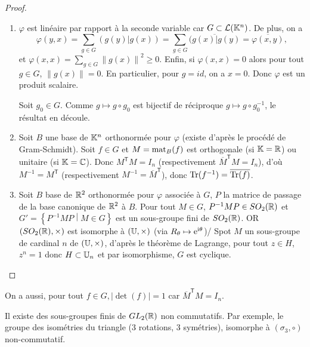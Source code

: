 \documentclass[12pt]{article}
\begin{document}
\begin{proof}
	\phantom{}
	\begin{enumerate}
		\item $\varphi$ est linéaire par rapport à la seconde variable car $G\subset\mathcal{L}(\mathbb{K}^{n})$. De plus, on a 
		\begin{equation}
			\varphi(y,x)=\sum_{g\in G}(g(y)|g(x))=\sum_{g\in G}\overline{(g(x)|g(y)}=\overline{\varphi(x,y)},
		\end{equation}
		et $\varphi(x,x)=\sum_{g\in G}\left\lVert g(x)\right\rVert^{2}\geqslant0$. Enfin, si $\varphi(x,x)=0$ alors pour tout $g\in G$, $\left\lVert g(x)\right\rVert=0$. En particulier, pour $g=id$, on a $x=0$. Donc $\varphi$ est un produit scalaire.

		Soit $g_0\in G$. Comme $g\mapsto g\circ g_0$ est bijectif de réciproque $g\mapsto g\circ g_0^{-1}$, le résultat en découle.

		\item Soit $B$ une base de $\mathbb{K}^{n}$ orthonormée pour $\varphi$ (existe d'après le procédé de Gram-Schmidt). Soit $f\in G$ et $M=\operatorname{mat}_{B}(f)$ est orthogonale (si $\mathbb{K}=\mathbb{R}$) ou unitaire (si $\mathbb{K}=\mathbb{C}$). Donc $M^{\mathsf{T}}M=I_n$ (respectivement $\overline{M}^{\mathsf{T}}M=I_n$), d'où $M^{-1}=M^{\mathsf{T}}$ (respectivement $M^{-1}=\overline{M}^{\mathsf{T}}$), donc $\operatorname{Tr}(f^{-1})=\overline{\operatorname{Tr}(f)}$.
		
		\item Soit $B$ base de $\mathbb{R}^{2}$ orthonormée pour $\varphi$ associée à $G$, $P$ la matrice de passage de la base canonique de $\mathbb{R}^{2}$ à $B$. Pour tout $M\in G$, $P^{-1}MP\in SO_{2}(\mathbb{R})$ et $G'=\left\lbrace P^{-1}MP\middle| M\in G\right\rbrace$ est un sous-groupe fini de $SO_2(\mathbb{R})$. OR $(SO_2(\mathbb{R}),\times)$ est isomorphe à $(\mathbb{U},\times)$ (via $R_\theta\mapsto\mathrm{e}^{\mathrm{i}\theta}$)/ Spot $M$ un sous-groupe de cardinal $n$ de $(\mathbb{U},\times)$, d'après le théorème de Lagrange, pour tout $z\in H$, $z^{n}=1$ donc $H\subset\mathbb{U}_n$ et par isomorphisme, $G$ est cyclique.
	\end{enumerate}
\end{proof}

\begin{remark}
	On a aussi, pour tout $f\in G,\left\lvert\det(f)\right\rvert=1$ car $\overline{M}^{\mathsf{T}}M=I_n$.
\end{remark}

\begin{remark}
	Il existe des sous-groupes finis de $GL_2(\mathbb{R})$ non commutatifs. Par exemple, le groupe des isométries du triangle (3 rotations, 3 symétries), isomorphe à $(\sigma_3,\circ)$ non-commutatif.
\end{remark}
\end{document}
